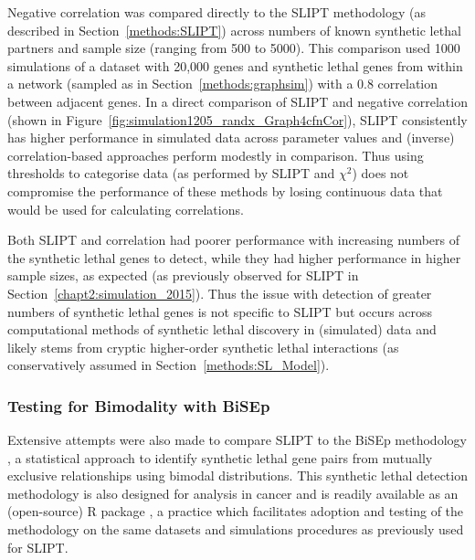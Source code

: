     
Negative correlation was compared directly to the \gls{SLIPT} methodology (as described in Section~\ref{methods:SLIPT}) across numbers of known \gls{synthetic lethal} partners and sample size (ranging from 500 to 5000). This comparison used 1000 simulations of a dataset with 20,000 genes and \gls{synthetic lethal} genes from within a network (sampled as in Section~\ref{methods:graphsim}) with a 0.8 correlation between adjacent genes. In a direct comparison of \gls{SLIPT} and negative correlation (shown in Figure~\ref{fig:simulation1205_randx_Graph4cfnCor}), \gls{SLIPT} consistently has higher performance in simulated data across parameter values and (inverse) correlation-based approaches perform modestly in comparison. Thus using thresholds to categorise  data (as performed by \gls{SLIPT} and $\chi^2$) does not compromise the performance of these methods by losing continuous data that would be used for calculating correlations. %


Both \gls{SLIPT} and correlation had poorer performance with increasing numbers of the \gls{synthetic lethal} genes to detect, while they had higher performance in higher sample sizes, as expected (as previously observed for \gls{SLIPT} in Section~\ref{chapt2:simulation_2015}). Thus the issue with detection of greater numbers of \gls{synthetic lethal} genes is not specific to \gls{SLIPT} but occurs across computational methods of \gls{synthetic lethal} discovery in (simulated)  data and likely stems from cryptic higher-order \gls{synthetic lethal} interactions (as conservatively assumed in Section~\ref{methods:SL_Model}). 
    
\FloatBarrier

\subsubsection{Testing for Bimodality with BiSEp}
\label{chapt5:compare_bisep}

Extensive attempts were also made to compare \gls{SLIPT} to the \gls{BiSEp} methodology \citep{Wappett2016}, a statistical approach to identify \gls{synthetic lethal} gene pairs from mutually exclusive relationships using bimodal distributions. This \gls{synthetic lethal} detection methodology is also designed for  analysis in cancer and is readily available as an (open-source) R package \citep{Wappett2014}, a practice which facilitates adoption and testing of the methodology on the same datasets and simulations procedures as previously used for \gls{SLIPT}.

